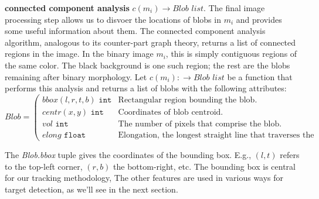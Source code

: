 \documentclass[letter]{article}
\begin{document}
  \textbf{connected component analysis} $c(m_i) \rightarrow \textit{Blob list}$. 
The final image processing step allows us to disvoer the locations of blobs in 
$m_i$ and provides some useful information about them. The connected component analysis
algorithm, analogous to its counter-part graph theory, returns a list of connected 
regions in the image. In the binary image $m_i$, this is simply contiguous regions
of the same color. The black background is one such region; the rest are the blobs
remaining after binary morphology. Let $c(m_i): \rightarrow \textit{Blob list}$ be a 
function that performs this analysis and returns a list of blobs with the following attributes: 
\[
 \textit{Blob} = \left (
  \begin{array}{ll}
    \textit{bbox} (l,r,t,b) \texttt{ int} & \textrm{Rectangular region bounding the blob.} \\
    \textit{centr} (x, y) \texttt{ int} &   \textrm{Coordinates of blob centroid.} \\ 
    \textit{vol} \texttt{ int} &            \textrm{The number of pixels that comprise the blob.} \\
    \textit{elong} \texttt{ float} &        \textrm{Elongation, the longest straight line that traverses the blob.}  
  \end{array} \right.
\] 

The \textit{Blob.bbox} tuple gives the coordinates of the bounding box. E.g., 
$(l,t)$ refers to the top-left corner, $(r,b)$ the bottom-right, etc. The bounding box 
is central for our tracking methodology, The other features are used in various ways for 
target detection, as we'll see in the next section. 
\end{document}
